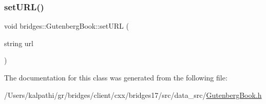 \mbox{\label{classbridges_1_1_gutenberg_book_a4a5fa52c405170b57535cd0fcde5e3cf}} 
\subsubsection{\texorpdfstring{set\+U\+R\+L()}{setURL()}}
{\footnotesize\ttfamily void bridges\+::\+Gutenberg\+Book\+::set\+U\+RL (\begin{DoxyParamCaption}\item[{string}]{url }\end{DoxyParamCaption})\hspace{0.3cm}{\ttfamily [inline]}}



The documentation for this class was generated from the following file\+:\begin{DoxyCompactItemize}
\item 
/\+Users/kalpathi/gr/bridges/client/cxx/bridges17/src/data\+\_\+src/\mbox{\hyperlink{_gutenberg_book_8h}{Gutenberg\+Book.\+h}}\end{DoxyCompactItemize}
